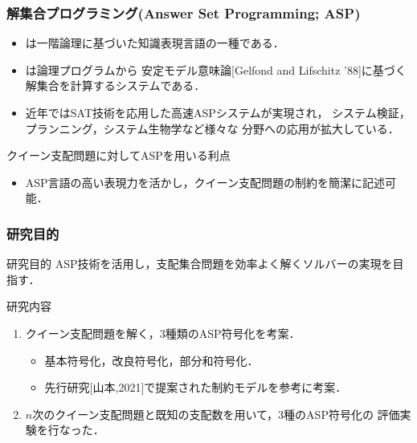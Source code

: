 \documentclass[dvipdfmx,10pt]{beamer}
\begin{document}
%
%

\begin{frame}\frametitle{解集合プログラミング(Answer Set Programming; ASP)}
 \begin{itemize}
  \item {}は一階論理に基づいた知識表現言語の一種である．
  \item {}は論理プログラムから
	安定モデル意味論[Gelfond and Lifschitz '88]に基づく
	解集合を計算するシステムである．
  \item 近年ではSAT技術を応用した高速ASPシステムが実現され，
	システム検証，プランニング，システム生物学など様々な
	分野への応用が拡大している．
 \end{itemize}
 \begin{alertblock}{クイーン支配問題に対してASPを用いる利点}
  \begin{itemize}
   \item ASP言語の高い表現力を活かし，クイーン支配問題の制約を簡潔に記述可能．
  \end{itemize}
 \end{alertblock}
\end{frame}
 
%
%

\begin{frame}\frametitle{研究目的}
 \begin{alertblock}{研究目的}
  ASP技術を活用し，支配集合問題を効率よく解くソルバーの実現を目指す．
 \end{alertblock}
 \begin{block}{研究内容}
  \begin{enumerate}
   \item クイーン支配問題を解く，3種類のASP符号化を考案．
	 \begin{itemize}
	  \item 基本符号化，改良符号化，部分和符号化．
	  \item 先行研究[山本,2021]で提案された制約モデルを参考に考案．
	 \end{itemize}
   \item $n$次のクイーン支配問題と既知の支配数を用いて，3種のASP符号化の
	 評価実験を行なった．
  \end{enumerate}
 \end{block}
\end{frame}
\end{document}
